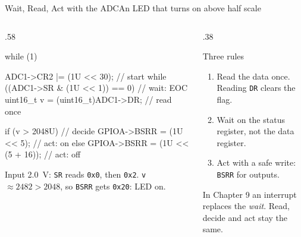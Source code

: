 \documentclass[9pt,aspectratio=169,xcolor=table]{beamer}
\begin{document}
\begin{frame}[fragile]{Wait, Read, Act with the ADC}{An LED that turns on above half scale}
    \begin{columns}[T]
    \begin{column}{.58\textwidth}
\begin{cc}[basicstyle=\ttfamily\scriptsize]
while (1) {
  ADC1->CR2 |= (1U << 30);               // start
  while ((ADC1->SR & (1U << 1)) == 0) {} // wait: EOC
  uint16_t v = (uint16_t)ADC1->DR;       // read once

  if (v > 2048U)                         // decide
    GPIOA->BSRR = (1U << 5);             // act: on
  else
    GPIOA->BSRR = (1U << (5 + 16));      // act: off
}
\end{cc}
        {\small Input 2.0~V: \texttt{SR} reads \texttt{0x0}, then \texttt{0x2}. \texttt{v} $\approx 2482 > 2048$, so \texttt{BSRR} gets \texttt{0x20}: LED on.}
    \end{column}
    \begin{column}{.38\textwidth}
        \begin{block}{Three rules}
        {\small
        \begin{enumerate}\itemsep1pt
            \item \alert{Read the data once.} Reading \texttt{DR} clears the flag.
            \item \alert{Wait on the status register}, not the data register.
            \item \alert{Act with a safe write}: \texttt{BSRR} for outputs.
        \end{enumerate}}
        \end{block}

        \vspace{1mm}
        {\small In Chapter 9 an interrupt replaces the \emph{wait}. Read, decide and act stay the same.}
    \end{column}
    \end{columns}
\end{frame}
\end{document}
